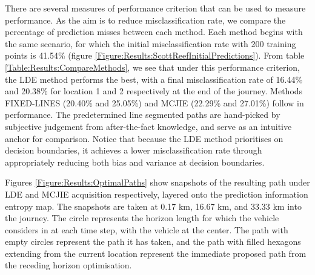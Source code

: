 \documentclass{article}
\begin{document}
		  				
		There are several measures of performance criterion that can be used to measure performance. As the aim is to reduce misclassification rate, we compare the percentage of prediction misses between each method. Each method begins with the same scenario, for which the initial misclassification rate with 200 training points is 41.54\% (figure \ref{Figure:Results:ScottReefInitialPredictions}). From table \ref{Table:Results:CompareMethods}, we see that under this performance criterion, the LDE method performs the best, with a final misclassification rate of 16.44\% and 20.38\% for location 1 and 2 respectively at the end of the journey. Methods FIXED-LINES (20.40\% and 25.05\%) and MCJIE (22.29\% and 27.01\%) follow in performance. The predetermined line segmented paths are hand-picked by subjective judgement from after-the-fact knowledge, and serve as an intuitive anchor for comparison. Notice that because the LDE method prioritises on decision boundaries, it achieves a lower misclassification rate through appropriately reducing both bias and variance at decision boundaries.
			
		Figures \ref{Figure:Results:OptimalPaths} show snapshots of the resulting path under LDE and MCJIE acquisition respectively, layered onto the prediction information entropy map. The snapshots are taken at 0.17 km, 16.67 km, and 33.33 km into the journey. The circle represents the horizon length for which the vehicle considers in at each time step, with the vehicle at the center. The path with empty circles represent the path it has taken, and the path with filled hexagons extending from the current location represent the immediate proposed path from the receding horizon optimisation.
		
\end{document}
